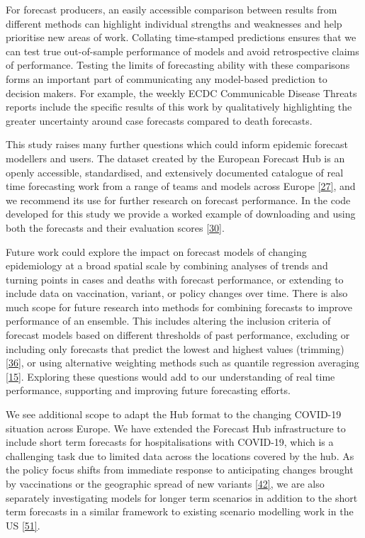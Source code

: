 \documentclass[
]{article}
\begin{document}
For forecast producers, an easily accessible comparison between results from different methods can highlight individual strengths and weaknesses and help prioritise new areas of work. Collating time-stamped predictions ensures that we can test true out-of-sample performance of models and avoid retrospective claims of performance. Testing the limits of forecasting ability with these comparisons forms an important part of communicating any model-based prediction to decision makers. For example, the weekly ECDC Communicable Disease Threats reports include the specific results of this work by qualitatively highlighting the greater uncertainty around case forecasts compared to death forecasts.

This study raises many further questions which could inform epidemic forecast modellers and users. The dataset created by the European Forecast Hub is an openly accessible, standardised, and extensively documented catalogue of real time forecasting work from a range of teams and models across Europe \protect\hyperlink{ref-europeancovid-19forecasthubEuropeanCovid19Forecast}{{[}27{]}}, and we recommend its use for further research on forecast performance. In the code developed for this study we provide a worked example of downloading and using both the forecasts and their evaluation scores \protect\hyperlink{ref-PredictivePerformanceMultimodel2022}{{[}30{]}}.

Future work could explore the impact on forecast models of changing epidemiology at a broad spatial scale by combining analyses of trends and turning points in cases and deaths with forecast performance, or extending to include data on vaccination, variant, or policy changes over time. There is also much scope for future research into methods for combining forecasts to improve performance of an ensemble. This includes altering the inclusion criteria of forecast models based on different thresholds of past performance, excluding or including only forecasts that predict the lowest and highest values (trimming) \protect\hyperlink{ref-taylorCombiningProbabilisticForecasts2021}{{[}36{]}}, or using alternative weighting methods such as quantile regression averaging \protect\hyperlink{ref-funkShorttermForecastsInform2020}{{[}15{]}}. Exploring these questions would add to our understanding of real time performance, supporting and improving future forecasting efforts.

We see additional scope to adapt the Hub format to the changing COVID-19 situation across Europe. We have extended the Forecast Hub infrastructure to include short term forecasts for hospitalisations with COVID-19, which is a challenging task due to limited data across the locations covered by the hub. As the policy focus shifts from immediate response to anticipating changes brought by vaccinations or the geographic spread of new variants \protect\hyperlink{ref-europeancentrefordiseasepreventionandcontrolOverviewImplementationCOVID192021}{{[}42{]}}, we are also separately investigating models for longer term scenarios in addition to the short term forecasts in a similar framework to existing scenario modelling work in the US \protect\hyperlink{ref-borcheringModelingFutureCOVID192021}{{[}51{]}}.
\end{document}
